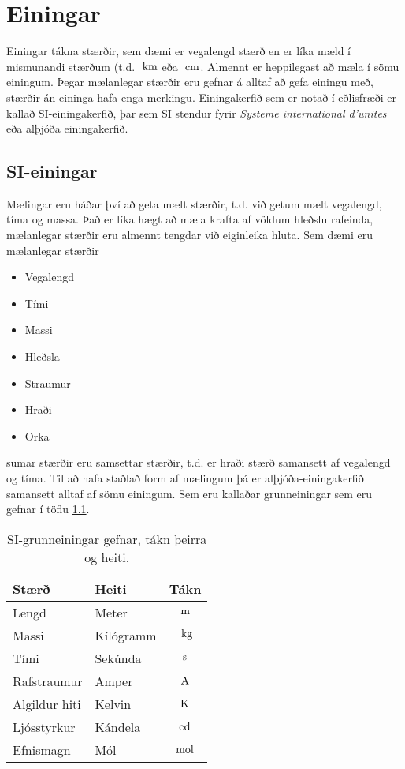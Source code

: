 \chapter{Einingar}
Einingar tákna stærðir, sem dæmi er vegalengd stærð en er líka mæld í mismunandi
stærðum (t.d. $\textrm{ k}\textrm{m}$ eða $\textrm{ c}\textrm{m}$. Almennt er heppilegast að
mæla í sömu einingum. Þegar mælanlegar stærðir eru gefnar á alltaf að gefa
einingu með, stærðir án eininga hafa enga merkingu. Einingakerfið sem er notað 
í eðlisfræði er kallað SI-einingakerfið, þar sem
SI stendur fyrir \emph{Systeme international d'unites} eða alþjóða einingakerfið.

\section{SI-einingar}
Mælingar eru háðar því að geta mælt stærðir, t.d. við getum mælt vegalengd, tíma og
massa. Það er líka hægt að mæla krafta af völdum hleðslu rafeinda, mælanlegar
stærðir eru almennt tengdar við eiginleika hluta. Sem dæmi eru mælanlegar stærðir
\begin{itemize}
	\item Vegalengd
	\item Tími
	\item Massi
	\item Hleðsla
	\item Straumur
	\item Hraði
	\item Orka
\end{itemize}
sumar stærðir eru samsettar stærðir, t.d. er hraði stærð samansett af vegalengd 
og tíma. Til að hafa staðlað form af mælingum þá er alþjóða-einingakerfið samansett alltaf
af sömu einingum. Sem eru kallaðar grunneiningar sem eru gefnar í 
töflu \ref{tab:units:baseunits}.
\begin{table}[hbt]
	\label{tab:units:baseunits}
	\centering
	\begin{tabularx}{0.55\textwidth}{Xlc}
		\toprule
		Stærð & Heiti & Tákn \\
		\midrule
		Lengd & Meter & $\textrm{m}$ \\
		\midrule
		Massi & Kílógramm & $\textrm{ k}\textrm{g}$ \\
		\midrule
		Tími & Sekúnda & $\textrm{s}$ \\
		\midrule
		Rafstraumur & Amper & $\textrm{A}$ \\
		\midrule
		Algildur hiti & Kelvin & $\text{K}$ \\
		\midrule
		Ljósstyrkur & Kándela & $\text{cd}$ \\
		\midrule
		Efnismagn & Mól & $\text{mol}$ \\
		\bottomrule
	\end{tabularx}
	\caption{ 
		SI-grunneiningar gefnar, tákn þeirra og heiti.
		}
\end{table}
